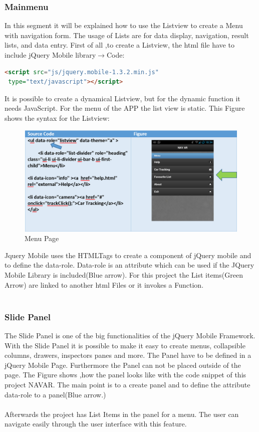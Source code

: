 \subsubsection{Mainmenu}
In this segment it will be explained how to use the Listview to create a Menu with navigation form. The usage of Lists are for data display, navigation, result lists, and data entry. First of all ,to create a  Listview, the html file have to include jQuery Mobile library$\rightarrow$Code:
\begin{lstlisting}[language=html,caption= Input Library,captionpos=b]
<script src="js/jquery.mobile-1.3.2.min.js"
 type="text/javascript"></script>

\end{lstlisting}

It is possible to create a dynamical Listview, but for the dynamic function it needs JavaScript. For the menu of the APP the list view is static. This Figure shows the syntax for the Listview:

\begin{figure}[htbp]
\centering
\includegraphics[width=1.0\linewidth]{graphics/Menu.PNG}
\caption{Menu Page}
\end{figure}

Jquery Mobile uses the HTMLTags  to create a component of  jQuery mobile and to define the data-role. Data-role is an attribute which can be used if the JQuery Mobile Library is included(Blue arrow). For this project the List items(Green Arrow) are linked to another html Files or it invokes a Function.\\\\

\subsubsection{Slide Panel}
The Slide Panel is one of the big functionalities of the jQuery Mobile Framework. With the Slide Panel it is possible to make it easy to create menus, collapsible columns, drawers, inspectors panes and more. The Panel have to be defined in a jQuery Mobile Page. Furthermore the Panel can not be placed outside of the page. The Figure shows ,how the panel looks like with the code snippet of this project NAVAR. The main point is to a create panel and to define the attribute data-role to a panel(Blue arrow.)\\\\
Afterwards the project has List Items in the panel for a menu. The user can navigate easily through the user interface with this feature.\cite{Panel}


